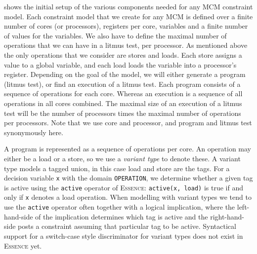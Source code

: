 \documentclass[runningheads]{llncs}
\newcommand{\essence}[0]{\textsc{Essence}}
\begin{document}
 shows the initial setup of the various components needed for any MCM constraint model.
Each constraint model that we create for any MCM is defined over a finite number of cores (or processors), registers per core, variables and a finite number of values for the variables.
We also have to define the maximal number of operations that we can have in a litmus test, per processor.
As mentioned above the only operations that we consider are stores and loads.
Each store assigns a value to a global variable, and each load loads the variable into a processor's register.
Depending on the goal of the model, we will either generate a program (litmus test), or find an execution of a litmus test.
Each program consists of a sequence of operations for each core.
Whereas an execution is a sequence of all operations in all cores combined.
The maximal size of an execution of a litmus test will be the number of processors times the maximal number of operations per processors.
Note that we use core and processor, and program and litmus test synonymously here.

A program is represented as a sequence of operations per core. An operation may either be a load or a store, so we use a \emph{variant type} to denote these. A variant type models a tagged union, in this case load and store are the tags. For a decision variable \texttt{x} with the domain \texttt{OPERATION}, we determine whether a given tag is active using the \texttt{active} operator of \essence{}: \texttt{active(x, load)} is true if and only if \texttt{x} denotes a load operation. When modelling with variant types we tend to use the \texttt{active} operator often together with a logical implication, where the left-hand-side of the implication determines which tag is active and the right-hand-side posts a constraint assuming that particular tag to be active. Syntactical support for a switch-case style discriminator for variant types does not exist in \essence{} yet.
\end{document}
